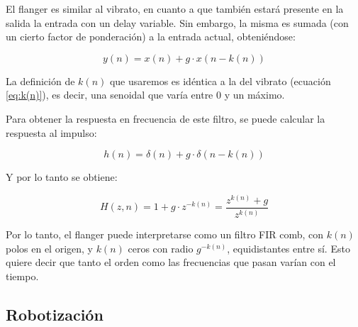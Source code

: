 \documentclass[assd_tp2_main.tex]{subfiles}
\begin{document}
El flanger es similar al vibrato, en cuanto a que tambi\'en estar\'a presente en la salida la entrada con un delay variable. Sin embargo, la misma es sumada (con un cierto factor de ponderaci\'on) a la entrada actual, obteni\'endose:

\begin{equation}
	y(n) = x(n) + g\cdot x(n-k(n))
\end{equation}

La definici\'on de $k(n)$ que usaremos es id\'entica a la del vibrato (ecuaci\'on \ref{eq:k(n)}), es decir, una senoidal que var\'ia entre 0 y un m\'aximo. 

Para obtener la respuesta en frecuencia de este filtro, se puede calcular la respuesta al impulso:

\[
	h(n) = \delta (n) + g \cdot \delta (n-k(n))
\]

Y por lo tanto se obtiene:

\[
	H(z, n) = 1 + g\cdot z^{-k(n)} = \frac{z^{k(n)} + g}{z^{k(n)}}
\]

Por lo tanto, el flanger puede interpretarse como un filtro FIR comb, con $k(n)$ polos en el origen, y $k(n)$ ceros con radio $g^{-k(n)}$, equidistantes entre s\'i. Esto quiere decir que tanto el orden como las frecuencias que pasan var\'ian con el tiempo.




\subsection{Robotizaci\'on}
\end{document}
